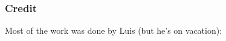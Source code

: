 \documentclass{beamer}
\begin{document}
\begin{frame}
\begin{figure}[h]
  \end{figure}
\end{frame}

\begin{frame}
  \frametitle{Credit}
  Most of the work was done by Luis (but he's on vacation):
\end{frame}
\end{document}
